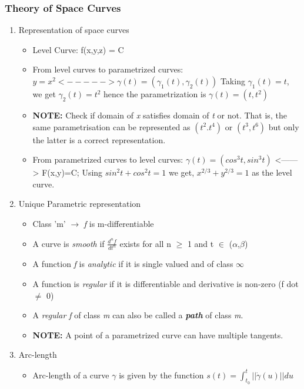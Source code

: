\documentclass[11pt]{article}
\begin{document}
\subsubsection{Theory of Space Curves}
\label{sec:orge27f023}
\begin{enumerate}
\item Representation of space curves
\label{sec:org62d7e26}
\begin{itemize}
\item Level Curve: f(x,y,z) = C
\item From level curves to parametrized curves:
\(y=x^{2} <-----> \gamma(t)=(\gamma_{1}(t),\gamma_{2}(t))\) Taking \(\gamma_{1}(t)=t\), we get \(\gamma_{2}(t)=t^{2}\) hence the parametrization is \(\gamma(t)=(t,t^{2})\)
\item \textbf{NOTE:} Check if domain of \emph{x} satisfies domain of \emph{t} or not. That is, the same parametrisation can be represented as \((t^{2}.t^{4})\) or \((t^{3},t^{6})\) but only the latter is a correct representation.
\item From parametrized curves to level curves:
\(\gamma(t)=(cos^{3}t,sin^{3}t)\) <------> F(x,y)=C; Using \(sin^{2}t+cos^{2}t=1\) we get, \(x^{2/3}+y^{2/3}=1\) as the level curve.
\end{itemize}
\item Unique Parametric representation
\label{sec:org9f4bb6f}
\begin{itemize}
\item Class 'm' \(\rightarrow\) \emph{f} is m-differentiable
\item A curve is \emph{smooth} if \(\frac{d^{n}f}{dt^{n}}\) exists for all n \(\ge\) 1 and t \(\in\) (\(\alpha\),\(\beta\))
\item A function \emph{f} is \emph{analytic} if it is single valued and of class \(\infty\)
\item A function is \emph{regular} if it is differentiable and derivative is non-zero (f dot \(\neq\) 0)
\item A \emph{regular f} of class \emph{m} can also be called a \emph{\textbf{path}} of class \emph{m}.
\item \textbf{NOTE:} A point of a parametrized curve can have multiple tangents.
\end{itemize}
\item Arc-length
\label{sec:org105fdef}
\begin{itemize}
\item Arc-length of a curve \(\gamma\) is given by the function \(s(t)=\int_{t_{0}}^{t}|| \dot{\gamma}(u)|| du\)

\end{itemize}
\end{enumerate}
\end{document}
